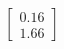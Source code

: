\documentclass[preview]{standalone}
\begin{document}
\begin{align*}
\begin{bmatrix} 0.16 \\ 1.66 \end{bmatrix}
\end{align*}
\end{document}
